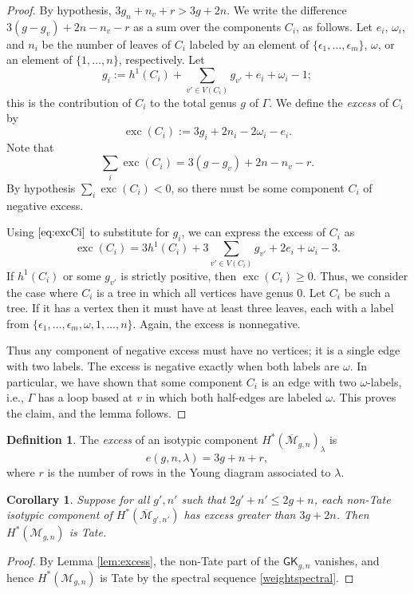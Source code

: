 \documentclass[12pt]{amsart}
\newtheorem{cor}[thm]{Corollary}
\theoremstyle{definition}
\numberwithin{equation}{section}
\newcommand{\M}{\mathcal{M}}
\DeclareMathOperator{\exc}{exc}
\newcommand{\Mb}{\overline{\M}}
\theoremstyle{definition} %
\newtheorem{defn}[thm]{Definition}
\theoremstyle{remark}
\begin{document}
\begin{proof}
By hypothesis, $3g_n + n_v + r > 3g + 2n$. We write the difference $3(g-g_v) + 2n - n_v - r$ as a sum over the components $C_i$, as follows. Let $e_i$, $\omega_i$, and $n_i$ be the number of leaves of $C_i$ labeled by an element of $\{ \epsilon_1, \ldots, \epsilon_m\}$, $\omega$, or an element of $\{1, \ldots, n\}$, respectively. Let
$$g_i := h^1(C_i) + \sum_{v' \in V(C_i)} g_{v'} + e_i + \omega_i - 1;$$
this is the contribution of $C_i$ to the total genus $g$ of $\Gamma.$ We define the \emph{excess} of $C_i$ by
\begin{equation} \label{eq:excCi}
\exc(C_i) := 3g_i + 2n_i -2 \omega_i - e_i.
\end{equation}
Note that  
\[
    \sum_i \exc(C_i) = 3(g-g_v) + 2n - n_v - r. 
\]
By hypothesis $\sum_i \exc(C_i) < 0$, so there must be some component $C_i$ of negative excess.

Using $\eqref{eq:excCi}$ to substitute for $g_i$, we can express the excess of $C_i$ as  $$\exc(C_i) = 3h^1(C_i) + 3 \sum_{v' \in V(C_i)} g_{v'} + 2 e_i + \omega_i - 3.$$ If $h^1(C_i)$ or some $g_{v'}$ is strictly positive, then $\exc(C_i) \geq 0$. Thus, we consider the case where $C_i$ is a tree in which all vertices have genus 0. Let $C_i$ be such a tree. If it has a vertex then it must have at least three leaves, each with a label from $\{ \epsilon_1, \ldots, \epsilon_m, \omega, 1, \ldots, n \}$.  Again, the excess is nonnegative.

Thus any component of negative excess must have no vertices; it is a single edge with two labels. The excess is negative exactly when both labels are $\omega$. In particular, we have shown that some component $C_i$ is an edge with two $\omega$-labels, i.e., $\Gamma$ has a loop based at $v$ in which both half-edges are labeled $\omega$. This proves the claim, and the lemma follows. \end{proof}


\begin{defn}
The \emph{excess} of an isotypic component $H^*(\Mb_{g,n})_{\lambda}$ is
\[
e(g,n,\lambda) = 3g + n + r,
\]
where $r$ is the number of rows in the Young diagram associated to $\lambda$. 
\end{defn}

\begin{cor}\label{cor:excessivenessnonTate}
    Suppose for all $g',n'$ such that $2g'+n'\leq 2g+n$, each non-Tate isotypic component of $H^*(\Mb_{g',n'})$ has excess greater than $3g+2n$. Then $H^*(\M_{g,n})$ is Tate.
\end{cor}
\begin{proof}
    By Lemma \ref{lem:excess}, the non-Tate part of the $\mathsf{GK}_{g,n}$ vanishes, and hence $H^*(\M_{g,n})$ is Tate by the spectral sequence \eqref{weightspectral}.
\end{proof}
\end{document}
